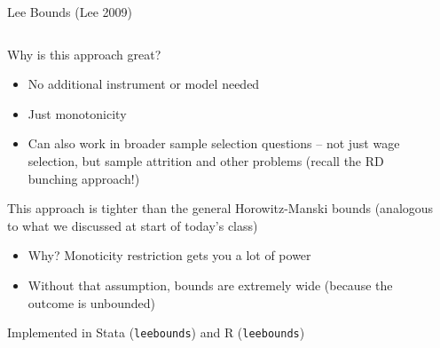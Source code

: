 \documentclass[notes,11pt, aspectratio=169]{beamer}
\newenvironment{wideitemize}{\itemize\addtolength{\itemsep}{10pt}}{\enditemize}
\begin{document}
\begin{frame}{Lee Bounds (Lee 2009)}
      \begin{columns}[onlytextwidth, T] %
        \begin{column}{.8\textwidth}
          \begin{wideitemize}
          \item Why is this approach great?
            \begin{itemize}
            \item No additional instrument or model needed
            \item Just monotonicity
            \item Can also work in broader sample selection questions
              -- not just wage selection, but sample attrition and
              other problems (recall the RD bunching approach!)
            \end{itemize}
          \item This approach is tighter than the general
            Horowitz-Manski bounds (analogous to what we discussed at
            start of today's class)
            \begin{itemize}
            \item Why? Monoticity restriction gets you a lot of power
            \item Without that assumption, bounds are extremely wide
              (because the outcome is unbounded)
            \end{itemize}
          \item Implemented in Stata (\texttt{leebounds}) and R
            (\texttt{leebounds})
          \end{wideitemize}
      \end{column}%
      \hfill%
      \begin{column}{.5\textwidth}
      \end{column}%
    \end{columns}
\end{frame}
\end{document}
